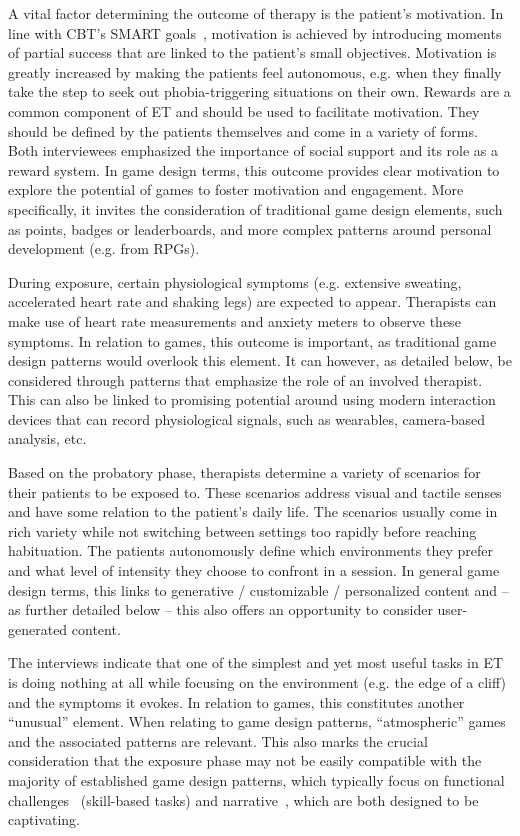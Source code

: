 A vital factor determining the outcome of therapy is the patient's motivation. In line with \ac{CBT}'s SMART goals~\cite{fenn2013}, motivation is achieved by introducing moments of partial success that are linked to the patient's small objectives. Motivation is greatly increased by making the patients feel autonomous, e.g. when they finally take the step to seek out phobia-triggering situations on their own. Rewards are a common component of \ac{ET} %
and should be used to facilitate motivation. They should be defined by the patients themselves and come in a variety of forms. Both interviewees emphasized the importance of social support and its role as a reward system. In game design terms, this outcome provides clear motivation to explore the potential of games to foster motivation and engagement. More specifically, it invites the consideration of traditional game design elements, such as points, badges or leaderboards, and more complex patterns around personal development (e.g. from RPGs).

During exposure, certain physiological symptoms (e.g. extensive sweating, accelerated heart rate and shaking legs) are expected to appear. Therapists can make use of heart rate measurements and anxiety meters to observe these symptoms. In relation to games, this outcome is important, as traditional game design patterns would overlook this element. It can however, as detailed below, be considered through patterns that emphasize the role of an involved therapist. This can also be linked to promising potential around using modern interaction devices that can record physiological signals, such as wearables, camera-based analysis, etc.

Based on the probatory phase, therapists determine a variety of scenarios for their patients to be exposed to. These scenarios address visual and tactile senses and have some relation to the patient’s daily life. The scenarios usually come in rich variety while not switching between settings too rapidly before reaching habituation. The patients autonomously define which environments they prefer and what level of intensity they choose to confront in a session. In general game design terms, this links to generative / customizable / personalized content and -- as further detailed below -- this also offers an opportunity to consider user-generated content.

The interviews indicate that one of the simplest and yet most useful tasks in \ac{ET} %
is doing nothing at all while focusing on the environment (e.g. the edge of a cliff) and the symptoms it evokes. In relation to games, this constitutes another ``unusual'' element. When relating to game design patterns, ``atmospheric'' games and the associated patterns are relevant. This also marks the crucial consideration that the exposure phase may not be easily compatible with the majority of established game design patterns, which typically focus on functional challenges~\cite{cole2015} (skill-based tasks) and narrative~\cite{baranowski2008}, which are both designed to be captivating.

